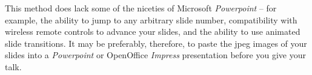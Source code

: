 This method does lack some of the niceties of Microsoft {\it Powerpoint} -- for
example, the ability to jump to any arbitrary slide number, compatibility with
wireless remote controls to advance your slides, and the ability to use
animated slide transitions. It may be preferably, therefore, to paste the jpeg
images of your slides into a {\it Powerpoint} or OpenOffice {\it Impress}
presentation before you give your talk.

